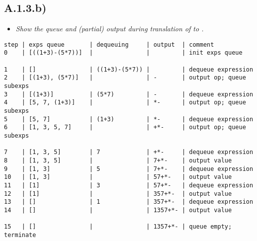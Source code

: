 \subsection{A.1.3.b)}
\begin{itemize}
  \item \emph{Show the queue and (partial) output during translation of  to .}
\end{itemize}
\begin{verbatim}
step | exps queue       | dequeuing     | output  | comment
0    | [((1+3)-(5*7))]  |               |         | init exps queue

1    | []               | ((1+3)-(5*7)) |         | dequeue expression
2    | [(1+3), (5*7)]   |               | -       | output op; queue subexps
3    | [(1+3)]          | (5*7)         | -       | dequeue expression
4    | [5, 7, (1+3)]    |               | *-      | output op; queue subexps
5    | [5, 7]           | (1+3)         | *-      | dequeue expression
6    | [1, 3, 5, 7]     |               | +*-     | output op; queue subexps

7    | [1, 3, 5]        | 7             | +*-     | dequeue expression
8    | [1, 3, 5]        |               | 7+*-    | output value
9    | [1, 3]           | 5             | 7+*-    | dequeue expression
10   | [1, 3]           |               | 57+*-   | output value
11   | [1]              | 3             | 57+*-   | dequeue expression
12   | [1]              |               | 357+*-  | output value
13   | []               | 1             | 357+*-  | dequeue expression
14   | []               |               | 1357+*- | output value

15   | []               |               | 1357+*- | queue empty; terminate
\end{verbatim}

